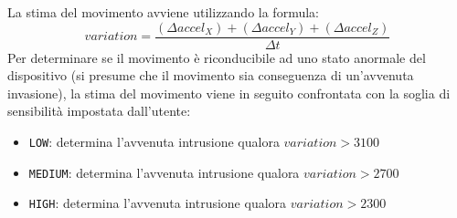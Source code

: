 La stima del movimento avviene utilizzando la formula:
\[variation = \frac{(\Delta accel_X) + (\Delta accel_Y) + (\Delta accel_Z)}{\Delta t}\]
Per determinare se il movimento è riconducibile ad uno stato anormale del dispositivo (si presume che il movimento sia conseguenza di un'avvenuta invasione), la stima del movimento viene in seguito confrontata con la soglia di sensibilità impostata dall'utente:
\begin{itemize}
  \item \texttt{LOW}: determina l'avvenuta intrusione qualora $variation >  3100$
  \item \texttt{MEDIUM}: determina l'avvenuta intrusione qualora $variation > 2700$
  \item \texttt{HIGH}: determina l'avvenuta intrusione qualora $variation > 2300$
\end{itemize}~\\

